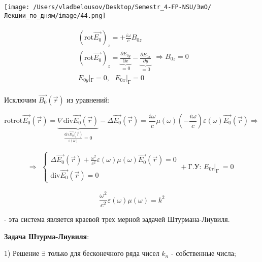 \documentclass[12pt, a4paper]{report}
\begin{document}
\begin{center}
    \texttt{[image: /Users/vladbelousov/Desktop/Semestr\_4-FP-NSU/ЭиО/Лекции\_по\_дням/image/44.png]}
\end{center}




\[ \begin{aligned}
    \begin{array}{l|}
        \displaystyle (\mathrm{rot }  \vec{E_0})_z =  + \frac{i \omega }{c } B_{0z}   \\
        (\mathrm{rot }  \vec{E_0})_z = \underbrace{\frac{\partial E_{0y } }{\partial  x}}_{=0} - \underbrace{\frac{\partial  E_{0x } }{\partial  y } }_{=0}  \\
        E_{0y } |_{\text{Г} } =0 , \text{ }  E_{0x } |_{\text{Г} } =0 
    \end{array}
    \Rightarrow  B_{0z } = 0
\end{aligned} \] 

Исключим \( \vec{B_0 } (\vec{r } ) \) из уравнений: 

\[ \mathrm{rot } \mathrm{rot } \vec{E_0 }( \vec{r }  ) = \underbrace{\nabla \mathrm{div } \vec{E_0 }(\vec{r } )}_{\frac{\mathrm{div } \vec{D_0 }(\vec{r } )}  {\varepsilon(\omega)} = 0} - \Delta \vec{E_0 } (\vec{r } )  = \frac{i \omega }{c} \mu (\omega )\left( -\frac{ i \omega}{c}  \right) \varepsilon(\omega ) \vec{E_0 }(\vec{r } )   \Rightarrow   \] 

\[  \Rightarrow \begin{aligned}
    \begin{cases}
        \displaystyle \Delta \vec{E_0 }(\vec{r } ) + \frac{ \omega ^2 }{c ^2 }\varepsilon( \omega ) \mu (\omega ) \vec{E_0 }(\vec{r } ) = 0 \\
        \displaystyle \mathrm{div } \vec{E_0 }(\vec{r } ) = 0 
    \end{cases} 
    + \text{Г.У: } E_{0 \tau} |_{\text{Г } }  = 0 
\end{aligned}  \] 

\[ \frac{ \omega ^2 }{c ^2 }\varepsilon( \omega ) \mu (\omega ) = k ^2  \] 

- эта система является краевой трех мерной задачей Штурмана-Лиувиля.

\textbf{Задача Штурма-Лиувиля}: 

1) Решение \( \exists    \)  только для бесконечного ряда чисел \( k_n \) - собственные числа; 
\end{document}
